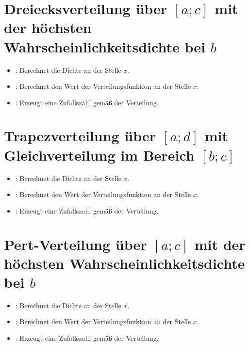 \section{Dreiecksverteilung über \texorpdfstring{$[a;c]$}{[a;c]} mit der höchsten Wahrscheinlichkeitsdichte bei \texorpdfstring{$b$}{b}}

\begin{itemize}

\item
{}:
Berechnet die Dichte an der Stelle $x$.

\item
{}:
Berechnet den Wert der Verteilungsfunktion an der Stelle $x$.

\item
{}:
Erzeugt eine Zufallszahl gemäß der Verteilung.

\end{itemize}



\section{Trapezverteilung über \texorpdfstring{$[a;d]$}{[a;d]} mit Gleichverteilung im Bereich \texorpdfstring{$[b;c]$}{[b;c]}}

\begin{itemize}

\item
{}:
Berechnet die Dichte an der Stelle $x$.

\item
{}:
Berechnet den Wert der Verteilungsfunktion an der Stelle $x$.

\item
{}:
Erzeugt eine Zufallszahl gemäß der Verteilung.

\end{itemize}



\section{Pert-Verteilung über \texorpdfstring{$[a;c]$}{[a;c]} mit der höchsten Wahrscheinlichkeitsdichte bei \texorpdfstring{$b$}{b}}

\begin{itemize}

\item
{}:
Berechnet die Dichte an der Stelle $x$.

\item
{}:
Berechnet den Wert der Verteilungsfunktion an der Stelle $x$.

\item
{}:
Erzeugt eine Zufallszahl gemäß der Verteilung.

\end{itemize}



